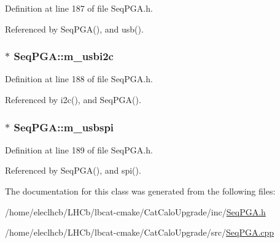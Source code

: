 Definition at line 187 of file SeqPGA.h.

Referenced by SeqPGA(), and usb().\hypertarget{classSeqPGA_a31d692cdc2f70dfd71671f3e2d688e20}{
\subsubsection[{m\_\-usbi2c}]{$\ast$ {\bf SeqPGA::m\_\-usbi2c}}}
\label{classSeqPGA_a31d692cdc2f70dfd71671f3e2d688e20}


Definition at line 188 of file SeqPGA.h.

Referenced by i2c(), and SeqPGA().\hypertarget{classSeqPGA_aeb7d559e042bced959366125781cef39}{
\subsubsection[{m\_\-usbspi}]{$\ast$ {\bf SeqPGA::m\_\-usbspi}}}
\label{classSeqPGA_aeb7d559e042bced959366125781cef39}


Definition at line 189 of file SeqPGA.h.

Referenced by SeqPGA(), and spi().

The documentation for this class was generated from the following files:\begin{DoxyCompactItemize}
\item 
/home/eleclhcb/LHCb/lbcat-\/cmake/CatCaloUpgrade/inc/\hyperlink{SeqPGA_8h}{SeqPGA.h}\item 
/home/eleclhcb/LHCb/lbcat-\/cmake/CatCaloUpgrade/src/\hyperlink{SeqPGA_8cpp}{SeqPGA.cpp}\end{DoxyCompactItemize}
